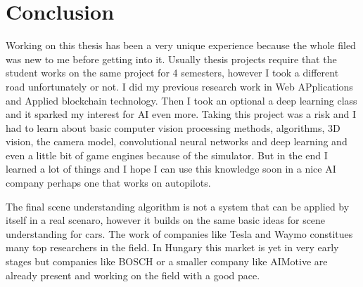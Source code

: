 \chapter{Conclusion}
\label{chap:conclusion}

Working on this thesis has been a very unique experience because the whole filed
was new to me before getting into it. Usually thesis projects require that the
student works on the same project for 4 semesters, however I took a different
road unfortunately or not. I did my previous research work in Web APplications
and Applied blockchain technology. Then I took an optional a deep learning class
and it sparked my interest for AI even more. Taking this project was a risk and
I had to learn about basic computer vision processing methods, algorithms, 3D
vision, the camera model, convolutional neural networks and deep learning and
even a little bit of game engines because of the simulator. But in the end I
learned a lot of things and I hope I can use this knowledge soon in a nice AI
company perhaps one that works on autopilots.

The final scene understanding algorithm is not a system that can be applied by
itself in a real scenaro, however it builds on the same basic ideas for scene
understanding for cars. The work of companies like Tesla and Waymo constitues
many top researchers in the field. In Hungary this market is yet in very early
stages but companies like BOSCH or a smaller company like AIMotive are already
present and working on the field with a good pace.